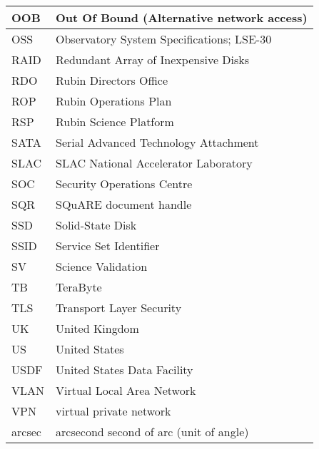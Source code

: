 \begin{longtable}{p{}p{}}
OOB & Out Of Bound (Alternative network access) \\\hline
OSS & Observatory System Specifications; LSE-30 \\\hline
RAID & Redundant Array of Inexpensive Disks \\\hline
RDO & Rubin Directors Office \\\hline
ROP & Rubin Operations Plan \\\hline
RSP & Rubin Science Platform \\\hline
SATA & Serial Advanced Technology Attachment \\\hline
SLAC & SLAC National Accelerator Laboratory \\\hline
SOC & Security Operations Centre \\\hline
SQR & SQuARE document handle \\\hline
SSD & Solid-State Disk \\\hline
SSID & Service Set Identifier \\\hline
SV & Science Validation \\\hline
TB & TeraByte \\\hline
TLS & Transport Layer Security \\\hline
UK & United Kingdom \\\hline
US & United States \\\hline
USDF & United States Data Facility \\\hline
VLAN &  Virtual Local Area Network \\\hline
VPN & virtual private network \\\hline
arcsec & arcsecond second of arc (unit of angle) \\\hline
\end{longtable}
